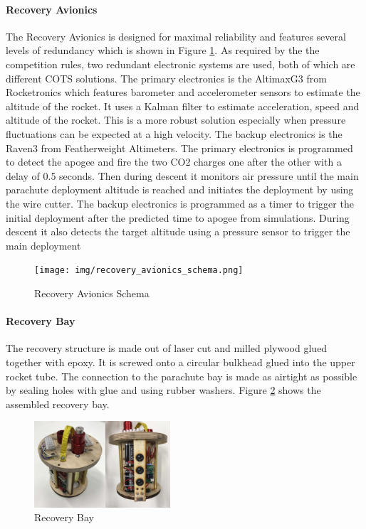  \paragraph{Recovery Avionics}
 \hfill \break
The Recovery Avionics is designed for maximal reliability and features several levels of redundancy which is shown in Figure \ref{f:recovery_avionics_schema}. As required by the the competition rules, two redundant electronic systems are used, both of which are different COTS solutions.
The primary electronics is the AltimaxG3 from Rocketronics which features barometer and accelerometer sensors to estimate the altitude of the rocket. It uses a Kalman filter to estimate acceleration, speed and altitude of the rocket. This is a more robust solution especially when pressure fluctuations can be expected at a high velocity.
The backup electronics is the Raven3 from Featherweight Altimeters.
The primary electronics is programmed to detect the apogee and fire the two CO2 charges one after the other with a delay of 0.5 seconds. Then during descent it monitors air pressure until the main parachute deployment altitude is reached and initiates the deployment by using the wire cutter.
 The backup electronics is programmed as a timer to trigger the initial deployment after the predicted time to apogee from simulations. During descent it also detects the target altitude using a pressure sensor to trigger the main deployment

  \begin{figure}[h!]
 	\centering
        \texttt{[image: img/recovery\_avionics\_schema.png]}
        \caption{Recovery Avionics Schema}
        \label{f:recovery_avionics_schema}
 \end{figure}
  

\paragraph{Recovery Bay} 
 The recovery structure is made out of laser cut and milled plywood glued together with epoxy. It is screwed onto a circular bulkhead glued into the upper rocket tube. The connection to the parachute bay is made as airtight as possible by sealing holes with glue and using rubber washers.
Figure \ref{f:recovery_bay} shows the assembled recovery bay.
 \begin{figure}[h!]
 	\centering
        \includegraphics[width=0.45\textwidth]{img/recovery_bay.jpg}
        \caption{Recovery Bay}
        \label{f:recovery_bay}
 \end{figure}
 
